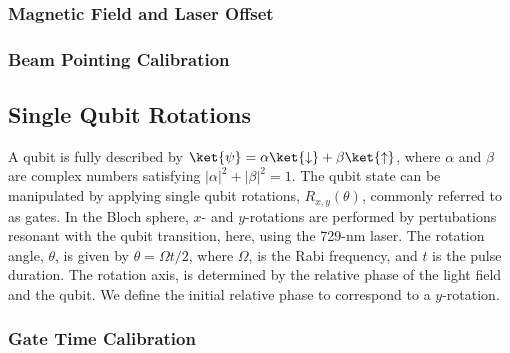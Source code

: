 \subsubsection{Magnetic Field and Laser Offset}
\label{sec:Magnetic Field and Laser Offset}

\subsubsection{Beam Pointing Calibration}
\label{sec:Beam Pointing Calibration}


\subsection{Single Qubit Rotations}
\label{sec:Single Qubit Gates}
    A qubit is fully described by $\ket{\psi} = \alpha\ket{\downarrow} + \beta\ket{\uparrow}$, where $\alpha$ and $\beta$ are complex numbers satisfying $|\alpha|^2 + |\beta|^2 = 1$. The qubit state can be manipulated by applying single qubit rotations, $R_{x,y}(\theta)$, commonly referred to as gates. In the Bloch sphere, $x$- and $y$-rotations are performed by pertubations resonant with the qubit transition, here, using the 729-nm laser. The rotation angle, $\theta$, is given by $\theta=\Omega t/2$, where $\Omega$, is the Rabi frequency, and $t$ is the pulse duration. The rotation axis, is determined by the relative phase of the light field and the qubit. We define the initial relative phase to correspond to a $y$-rotation.

\subsubsection{Gate Time Calibration}

